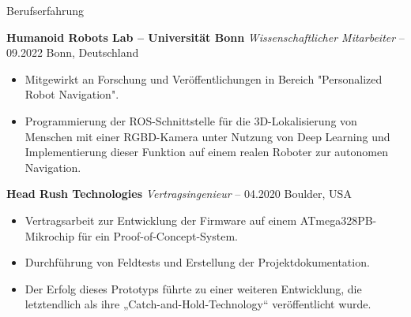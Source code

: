 \begin{rubric}{Berufserfahrung}

%
%
\entry*[] \textbf{Humanoid Robots Lab -- Universität Bonn} \hfill \textit{Wissenschaftlicher Mitarbeiter}  -- 09.2022 \hfill Bonn, Deutschland \newline  
\vspace{\CVItemizeHeaderSpacing} \begin{itemize}
	\setlength{\itemsep}{\CVItemizeSpacing}  
	\item Mitgewirkt an Forschung und Veröffentlichungen in Bereich "Personalized Robot Navigation".  
	\item Programmierung der ROS-Schnittstelle für die 3D-Lokalisierung von Menschen mit einer RGBD-Kamera unter Nutzung von Deep Learning und Implementierung dieser Funktion auf einem realen Roboter zur autonomen Navigation.  
\end{itemize}

%
%
\entry*[] \textbf{Head Rush Technologies} \hfill \textit{Vertragsingenieur}  -- 04.2020 \hfill Boulder, USA \newline  
\vspace{\CVItemizeHeaderSpacing} \begin{itemize} 
	\setlength{\itemsep}{\CVItemizeSpacing}  
	\item Vertragsarbeit zur Entwicklung der Firmware auf einem ATmega328PB-Mikrochip für ein Proof-of-Concept-System.  
	\item Durchführung von Feldtests und Erstellung der Projektdokumentation.  
	\item Der Erfolg dieses Prototyps führte zu einer weiteren Entwicklung, die letztendlich als ihre „Catch-and-Hold-Technology“ veröffentlicht wurde.  
\end{itemize}



\end{rubric}
